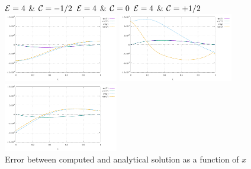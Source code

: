 \begin{center}
${\cal E}=4$ \& ${\cal C}=-1/2$  \hspace{2cm}
${\cal E}=4$ \& ${\cal C}=0$ \hspace{2cm}
${\cal E}=4$ \& ${\cal C}=+1/2$\\
\includegraphics[width=5cm]{python_codes/fieldstone_57/results/E04_Cm0p5/error.pdf}
\includegraphics[width=5cm]{python_codes/fieldstone_57/results/E04_C000/error.pdf}
\includegraphics[width=5cm]{python_codes/fieldstone_57/results/E04_Cp0p5/error.pdf}\\
{\captionfont Error between computed and analytical solution as a function of $x$} 
\end{center}


